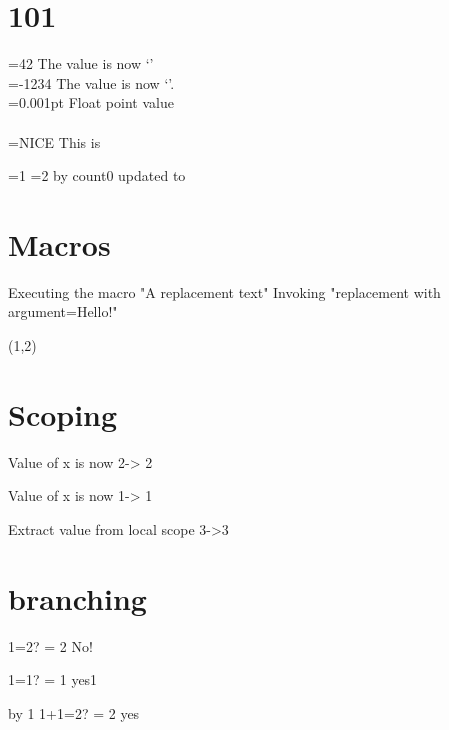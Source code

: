 \documentclass{article}
\begin{document}
\section{101}

	=42
	The value is now ‘\the{}’ \\
	\def\macro{-1234}
	=\macro
	The value is now ‘\the{}’.
	\newline\\
	=0.001pt
	Float point value \the{}\\
	\\
	\newtoks\slbstr
	\slbstr={NICE}%
	This is \the\slbstr

	=1 =2
	\advance{} by  %
	count0 updated to \the{}

\section{Macros}

\def\slbMacro{A replacement text}
Executing the macro "\slbMacro"
\def\slbArgMacro#1{replacement with argument=#1}
Invoking "\slbArgMacro{Hello!}"

\def\point(#1,#2){Point that take two args ->  #1 and #2}
\def\temp{(1,2)}
\expandafter\point\temp

\section{Scoping}
\def\x{1}

{
    \def\x{2}
    Value of x is now \x -> 2

    \global\def\y{3}
}

Value of x is now \x -> 1

Extract value from local scope \y ->3

\section{branching}

1=2?  = 2 %
\else
No!
\fi

1=1?  = 1
yes1
\else
\fi

\newcount\exactone %
\advance\exactone by 1
1+1=2? \ifnum \exactone = 2
yes\fi
\end{document}
